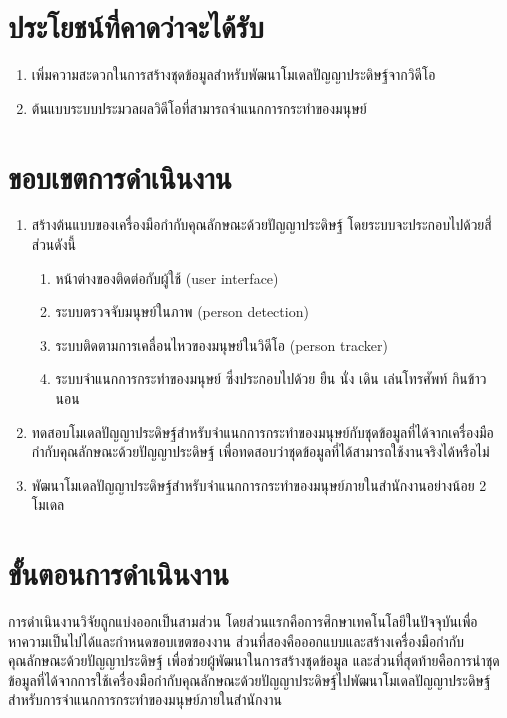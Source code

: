 
\section{ประโยชน์ที่คาดว่าจะได้รับ}
\begin{enumerate}
	\setlength\itemsep{-0.25em}
	\item เพิ่มความสะดวกในการสร้างชุดข้อมูลสำหรับพัฒนาโมเดลปัญญาประดิษฐ์จากวิดีโอ
	\item ต้นแบบระบบประมวลผลวิดีโอที่สามารถจำแนกการกระทำของมนุษย์
\end{enumerate}
\clearpage

\section{ขอบเขตการดำเนินงาน}
\begin{enumerate}
	\setlength\itemsep{-0.25em}
	\item สร้างต้นแบบของเครื่องมือกำกับคุณลักษณะด้วยปัญญาประดิษฐ์ โดยระบบจะประกอบไปด้วยสี่ส่วนดังนี้
	\begin{enumerate}
		\setlength\itemsep{-0.25em}
		\item หน้าต่างของติดต่อกับผู้ใช้ (user interface)
		\item ระบบตรวจจับมนุษย์ในภาพ (person detection)
		\item ระบบติดตามการเคลื่อนไหวของมนุษย์ในวิดีโอ (person tracker)
		\item ระบบจำแนกการกระทำของมนุษย์ ซึ่งประกอบไปด้วย ยืน นั่ง เดิน เล่นโทรศัพท์ กินข้าว นอน
	\end{enumerate}
	\item ทดสอบโมเดลปัญญาประดิษฐ์สำหรับจำแนกการกระทำของมนุษย์กับชุดข้อมูลที่ได้จากเครื่องมือกำกับคุณลักษณะด้วยปัญญาประดิษฐ์ เพื่อทดสอบว่าชุดข้อมูลที่ได้สามารถใช้งานจริงได้หรือไม่
	\item พัฒนาโมเดลปัญญาประดิษฐ์สำหรับจำแนกการกระทำของมนุษย์ภายในสำนักงานอย่างน้อย 2 โมเดล
\end{enumerate}

\section{ขั้นตอนการดำเนินงาน}
การดำเนินงานวิจัยถูกแบ่งออกเป็นสามส่วน โดยส่วนแรกคือการศึกษาเทคโนโลยีในปัจจุบันเพื่อหาความเป็นไปได้และกำหนดขอบเขตของงาน 
ส่วนที่สองคือออกแบบและสร้างเครื่องมือกำกับคุณลักษณะด้วยปัญญาประดิษฐ์ เพื่อช่วยผู้พัฒนาในการสร้างชุดข้อมูล 
และส่วนที่สุดท้ายคือการนำชุดข้อมูลที่ได้จากการใช้เครื่องมือกำกับคุณลักษณะด้วยปัญญาประดิษฐ์ไปพัฒนาโมเดลปัญญาประดิษฐ์สำหรับการจำแนกการกระทำของมนุษย์ภายในสำนักงาน
